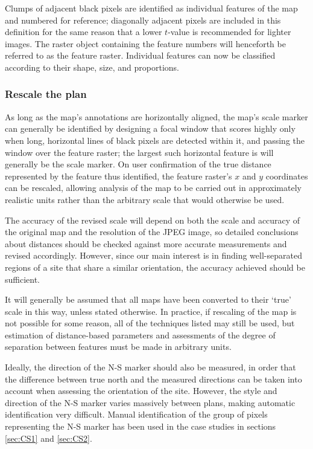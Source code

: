 \documentclass[../../ArchStats.tex]{subfiles}
\begin{document}
Clumps of adjacent black pixels are identified as individual features of the map and numbered for reference; diagonally adjacent pixels are included in this definition for the same reason that a lower $t$-value is recommended for lighter images. The raster object containing the feature numbers will henceforth be referred to as the feature raster. Individual features can now be classified according to their shape, size, and proportions.

\subsubsection{Rescale the plan}
\label{sec:rescale}

As long as the map's annotations are horizontally aligned, the map's scale marker can generally be identified by designing a focal window that scores highly only when long, horizontal lines of black pixels are detected within it, and passing the window over the feature raster; the largest such horizontal feature is will generally be the scale marker. On user confirmation of the true distance represented by the feature thus identified, the feature raster's $x$ and $y$ coordinates can be rescaled, allowing analysis of the map to be carried out in approximately realistic units rather than the arbitrary scale that would otherwise be used.

The accuracy of the revised scale will depend on both the scale and accuracy of the original map and the resolution of the JPEG image, so detailed conclusions about distances should be checked against more accurate measurements and revised accordingly. However, since our main interest is in finding well-separated regions of a site that share a similar orientation, the accuracy achieved should be sufficient.

It will generally be assumed that all maps have been converted to their `true' scale in this way, unless stated otherwise. In practice, if rescaling of the map is not possible for some reason, all of the techniques listed may still be used, but estimation of distance-based parameters and assessments of the degree of separation between features must be made in arbitrary units.

Ideally, the direction of the N-S marker should also be measured, in order that the difference between true north and the measured directions can be taken into account when assessing the orientation of the site. However, the style and direction of the N-S marker varies massively between plans, making automatic identification very difficult. Manual identification of the group of pixels representing the N-S marker has been used in the case studies in sections \ref{sec:CS1} and \ref{sec:CS2}.
\end{document}
